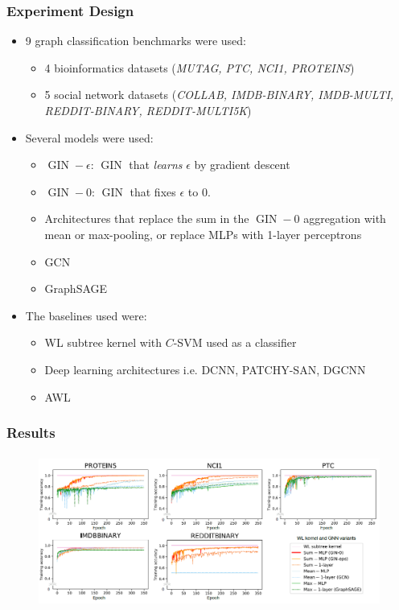 \documentclass{beamer}
\DeclareMathOperator{\gin}{GIN}
\begin{document}
\begin{frame}
\frametitle{Experiment Design}

\begin{itemize}
	\item 9 graph classification benchmarks were used:
	\begin{itemize}
		\item 4 bioinformatics datasets ({\it MUTAG, PTC, NCI1, PROTEINS})
		\item 5 social network datasets ({\it COLLAB, IMDB-BINARY, IMDB-MULTI, REDDIT-BINARY, REDDIT-MULTI5K})
	\end{itemize} \pause
	
	\item Several models were used:
	\begin{itemize}
		\item $\gin-\epsilon$: $\gin$ that {\it learns} $\epsilon$ by gradient descent
		\item $\gin-0$: $\gin$ that fixes $\epsilon$ to $0$.
		\item Architectures that replace the sum in the $\gin-0$ aggregation with mean or max-pooling, or replace MLPs with 1-layer perceptrons
		\item GCN
		\item GraphSAGE
	\end{itemize} \pause
	
	\item The baselines used were:
	\begin{itemize}
		\item WL subtree kernel with $C$-SVM used as a classifier
		\item Deep learning architectures i.e. DCNN, PATCHY-SAN, DGCNN
		\item AWL
	\end{itemize}
\end{itemize}

\end{frame}



\begin{frame}
\frametitle{Results}

\begin{figure}[hbt]
  \includegraphics[height=5cm]{fig5.png}
\end{figure}

\end{frame}
\end{document}
